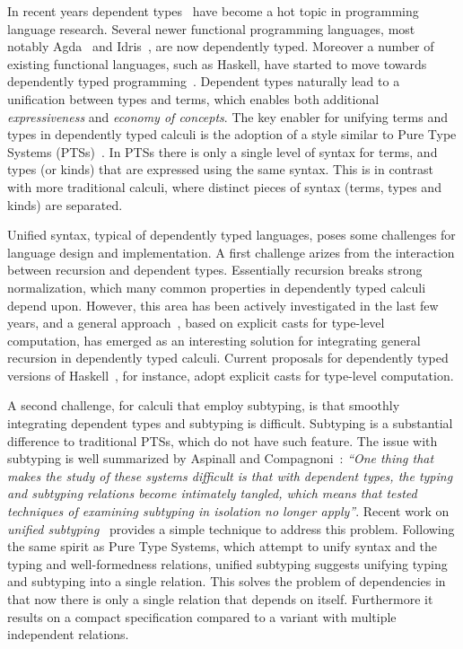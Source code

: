 In recent years dependent
types~\cite{coc,cayenne,dep:pisigma,sjoberg:msfp12,guru,fc:kind,zombie:popl14,zombie:popl15}
have become a hot topic in programming
language research. Several newer
functional programming languages, most notably Agda~\cite{2007_norell_agda} and
Idris~\cite{brady2013idris}, are now dependently typed. Moreover a number of existing functional
languages, such as Haskell, have started to move towards dependently typed programming~\cite{dependenthaskell}. Dependent types naturally lead to a unification between types and terms, which enables both
additional \emph{expressiveness} and \emph{economy of concepts}.
The key enabler for unifying terms and types in dependently typed
calculi is the adoption of a style similar to
Pure Type Systems (PTSs)~\cite{pts}. In PTSs there is only a single level
of syntax for terms, and types (or kinds) that are expressed using the
same syntax. This is in contrast with more traditional calculi, where
distinct pieces of syntax (terms, types and kinds) are separated.

Unified syntax, typical of dependently typed languages,
poses some challenges for language design and implementation.
A first challenge arizes from the interaction between recursion and dependent types.
Essentially recursion breaks strong normalization, which
many common properties in dependently typed calculi depend upon.
However, this area has been actively investigated in the
last few years, and a general approach~\cite{guru,sjoberg:msfp12, kimmel:plpv, zombie:popl15,
  isotype}, based on explicit
casts for type-level computation, has emerged as an interesting
solution for integrating general recursion in dependently typed
calculi. Current proposals for dependently typed versions of Haskell~\cite{dependenthaskell},
for instance, adopt explicit casts for type-level computation.

A second challenge, for calculi that employ subtyping, is that
smoothly integrating
dependent types and subtyping is difficult. Subtyping is a
substantial difference to traditional PTSs, which do not have such feature.
The issue with subtyping
is well summarized by Aspinall and Compagnoni~\cite{subdep}:
\emph{``One thing that makes the study of these systems difficult is that
  with
dependent types, the typing and subtyping relations become intimately
tangled, which means that tested techniques of examining subtyping in
isolation no longer apply''}.
Recent work on \emph{unified subtyping}~\cite{full} provides a
simple technique to address this problem.
Following the same spirit as Pure Type Systems,
which attempt to unify syntax and the typing and well-formedness relations,
unified subtyping suggests unifying typing
and subtyping into a single relation. This solves the problem of dependencies
in that now there is only a single relation that depends on itself. Furthermore
it results on a compact specification compared to a variant with multiple
independent relations.

